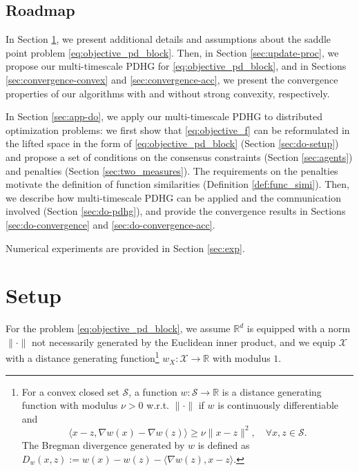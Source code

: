 \documentclass[10pt]{article}
\newcommand{\mc}{\mathcal}
\newcommand{\R}{\mathbb{R}}
\begin{document}
\subsection{Roadmap}

In Section \ref{sec:setup}, we present additional details and assumptions about the saddle point problem \eqref{eq:objective_pd_block}. Then, in Section \ref{sec:update-proc}, we propose our multi-timescale PDHG for \eqref{eq:objective_pd_block}, and in Sections \ref{sec:convergence-convex} and \ref{sec:convergence-acc}, we present the convergence properties of our algorithms with and without strong convexity, respectively.


In Section \ref{sec:app-do}, we apply our multi-timescale PDHG to distributed optimization problems: we first show that \eqref{eq:objective_f} can be reformulated in the lifted space in the form of \eqref{eq:objective_pd_block} (Section \ref{sec:do-setup}) and propose a set of conditions on the consensus constraints (Section \ref{sec:agents}) and penalties (Section \ref{sec:two_measures}). The requirements on the penalties motivate the definition of function similarities (Definition \ref{def:func_simi}). Then, we describe how multi-timescale PDHG can be applied and the communication involved (Section \ref{sec:do-pdhg}), and provide the convergence results in Sections \ref{sec:do-convergence} and \ref{sec:do-convergence-acc}. 


Numerical experiments are provided in Section \ref{sec:exp}. 






\section{Setup}\label{sec:setup}

For the problem \eqref{eq:objective_pd_block}, we assume $\R^d$ is equipped with a norm $\|\cdot\|$ not necessarily generated by the Euclidean inner product, and we equip $\mc X$ with a distance generating function\footnote{
For a convex closed set $\mc S$, a function $w:\mc S\to \R$ is a distance generating function \cite{Ghadimi2012} with modulus $\nu>0$ w.r.t. $\|\cdot\|$ if $w$ is continuously differentiable and 
\begin{displaymath}
    \langle x-z,\nabla w(x) -\nabla w(z)\rangle \geq \nu \|x-z\|^2,\quad \forall x,z\in \mc S.
\end{displaymath}
 The Bregman divergence generated by $w$ is defined as $D_w(x,z):=w(x) - w(z) - \langle \nabla w(z),x-z\rangle$. 
} $w_X:\mc X\to \R$ with modulus $1$.
\end{document}
